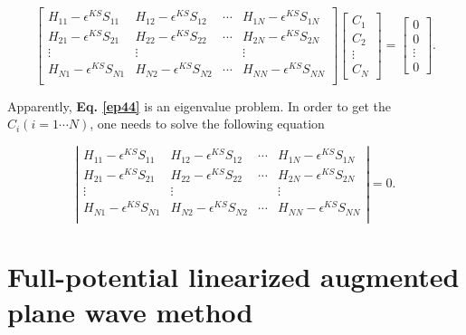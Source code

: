 \documentclass[a4paper, 12pt, titlepage,oneside,drop]{kthesis}
\begin{document}
\begin{equation}\label{ep44}
\left[
\begin{matrix}
    H_{11} - \epsilon^{KS}S_{11} & H_{12} - \epsilon^{KS}S_{12} & \cdots & H_{1N} - \epsilon^{KS}S_{1N} \\
    H_{21} - \epsilon^{KS}S_{21} & H_{22} - \epsilon^{KS}S_{22} & \cdots & H_{2N} - \epsilon^{KS}S_{2N} \\
    \vdots               & \vdots               &        & \vdots               \\
  H_{N1} - \epsilon^{KS}S_{N1} & H_{N2} - \epsilon^{KS}S_{N2} & \cdots & H_{NN} - \epsilon^{KS}S_{NN} \\
\end{matrix} \right] \left[ \begin{array}{c} C_1 \\ C_2 \\ \vdots \\ C_N\end{array} \right]
= \left[ \begin{array}{c} 0 \\ 0 \\ \vdots \\ 0 \end{array} \right].
\end{equation}

Apparently, \textbf{Eq. \ref{ep44}} is an eigenvalue problem. In order to get the $C_{i} (i = 1 \cdots N)$, one needs to solve the following equation

\begin{equation}\label{ep4}
\left|
\begin{matrix}
    H_{11} - \epsilon^{KS}S_{11} & H_{12} - \epsilon^{KS}S_{12} & \cdots & H_{1N} - \epsilon^{KS}S_{1N} \\
   H_{21} - \epsilon^{KS}S_{21} & H_{22} - \epsilon^{KS}S_{22} & \cdots & H_{2N} - \epsilon^{KS}S_{2N} \\
    \vdots               & \vdots               &        & \vdots               \\
  H_{N1} - \epsilon^{KS}S_{N1} & H_{N2} - \epsilon^{KS}S_{N2} & \cdots & H_{NN} - \epsilon^{KS}S_{NN} \\
\end{matrix} \right|
 = 0.
\end{equation}

\section{Full-potential linearized augmented plane wave method}\label{fplapwm}
\end{document}
